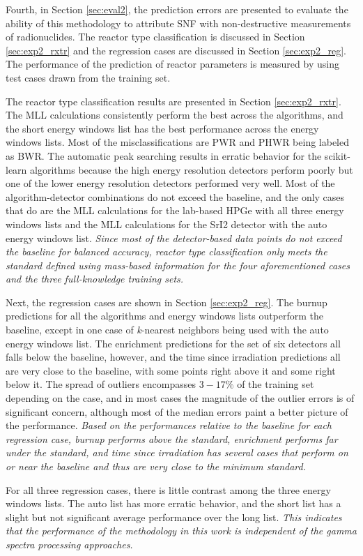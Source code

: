 Fourth, in Section \ref{sec:eval2}, the prediction errors are presented to
evaluate the ability of this methodology to attribute \gls{SNF} with
non-destructive measurements of radionuclides. The reactor type classification
is discussed in Section \ref{sec:exp2_rxtr} and the regression cases are
discussed in Section \ref{sec:exp2_reg}.  The performance of the prediction of
reactor parameters is measured by using test cases drawn from the training set.

The reactor type classification results are presented in Section
\ref{sec:exp2_rxtr}.  The \gls{MLL} calculations consistently perform the best
across the algorithms, and the short energy windows list has the best
performance across the energy windows lists.  Most of the misclassifications
are \gls{PWR} and \gls{PHWR} being labeled as \gls{BWR}.  The automatic peak
searching results in erratic behavior for the scikit-learn algorithms because
the high energy resolution detectors perform poorly but one of the lower energy
resolution detectors performed very well. Most of the algorithm-detector
combinations do not exceed the baseline, and the only cases that do are the
\gls{MLL} calculations for the lab-based \gls{HPGe} with all three energy
windows lists and the \gls{MLL} calculations for the \gls{SrI2} detector with
the auto energy windows list. \textit{Since most of the detector-based data
points do not exceed the baseline for balanced accuracy, reactor type
classification only meets the standard defined using mass-based information for
the four aforementioned cases and the three full-knowledge training sets.}

Next, the regression cases are shown in Section \ref{sec:exp2_reg}.  The burnup
predictions for all the algorithms and energy windows lists outperform the
baseline, except in one case of \textit{k}-nearest neighbors being used with
the auto energy windows list.  The enrichment predictions for the set of six
detectors all falls below the baseline, however, and the time since irradiation
predictions all are very close to the baseline, with some points right above it
and some right below it.  The spread of outliers encompasses $3-17\%$ of the
training set depending on the case, and in most cases the magnitude of the
outlier errors is of significant concern, although most of the median errors
paint a better picture of the performance.  \textit{Based on the performances
relative to the baseline for each regression case, burnup performs above the
standard, enrichment performs far under the standard, and time since
irradiation has several cases that perform on or near the baseline and thus are
very close to the minimum standard.}

For all three regression cases, there is little contrast among the three energy
windows lists. The auto list has more erratic behavior, and the short list has
a slight but not significant average performance over the long list.
\textit{This indicates that the performance of the methodology in this work is
independent of the gamma spectra processing approaches.}

